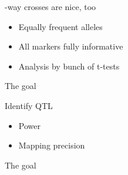 \documentclass[12pt]{article}
\newcommand{\headsize}{\fontsize{35}{35} \selectfont}
\newcommand{\smallsize}{\fontsize{25}{30} \selectfont}
\begin{document}
{\begin{minipage}{10in}
\begin{itemize}
\end{itemize}
\end{minipage}

\newpage


\headsize \color{myyellow}
\hfill \begin{minipage}{6.25in}
-way crosses are nice, too
\end{minipage}

\vspace{25mm}

\color{mywhite}
\smallsize

\hfill \begin{minipage}{10in}
\begin{itemize}
\itemsep24pt
\item Equally frequent alleles
\item All markers fully informative
\item Analysis by bunch of t-tests
\end{itemize}
\end{minipage}


\newpage


\headsize \color{myyellow}
\hfill \begin{minipage}{5.75in}
\centering
The goal
\end{minipage}

\vspace{25mm}

\color{mywhite}
\smallsize

\hfill \begin{minipage}{9.5in}
Identify QTL
\end{minipage}

\vspace{15mm}

\hfill \begin{minipage}{9in}
\color{myblue}
\begin{itemize}
\itemsep24pt
\item Power
\item Mapping precision
\end{itemize}
\end{minipage}

\newpage

\addtocounter{page}{-1}

\headsize \color{myyellow}
\hfill \begin{minipage}{5.75in}
\centering
The goal
\end{minipage}

}
\end{document}
